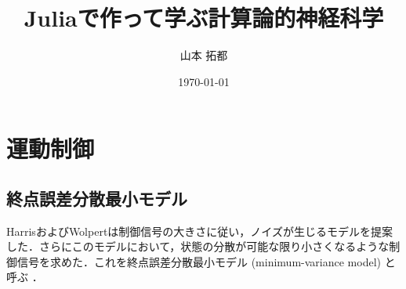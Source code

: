 \documentclass[titlepage]{ltjsbook}
\title{\Huge \textbf{Juliaで作って学ぶ計算論的神経科学}}
\author{\huge 山本 拓都}
\date{\huge \today}
\begin{document}
\setcounter{tocdepth}{2}
\tableofcontents
\clearpage
\chapter{運動制御}
\section{終点誤差分散最小モデル}
HarrisおよびWolpertは制御信号の大きさに従い，ノイズが生じるモデルを提案した．さらにこのモデルにおいて，状態の分散が可能な限り小さくなるような制御信号を求めた．これを終点誤差分散最小モデル (minimum-variance model) と呼ぶ \citep{Harris1998-gj}．
\end{document}
